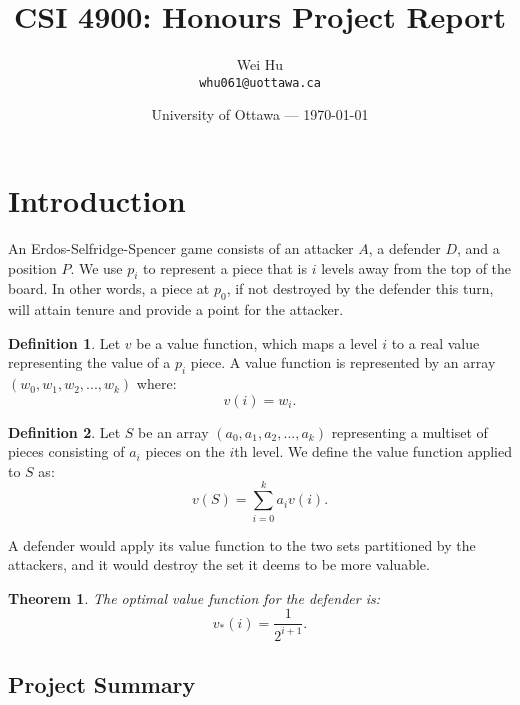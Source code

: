 \documentclass{article}
\title{CSI 4900: Honours Project Report} %
\author{Wei Hu\\ \texttt{whu061@uottawa.ca}} %
\date{University of Ottawa --- \today} %
\theoremstyle{plain}
\newtheorem{thm}{Theorem}[section]
\theoremstyle{definition}
\newtheorem{defn}{Definition}[section]
\theoremstyle{remark}
\begin{document}
\maketitle %


\section{Introduction} %

An Erdos-Selfridge-Spencer game consists of an attacker $A$, a defender $D$, and a position $P$. We use $p_{i}$ to represent a piece that is $i$ levels away from the top of the board. In other words, a piece at $p_{0}$, if not destroyed by the defender this turn, will attain tenure and provide a point for the attacker.

\begin{defn}
Let $v$ be a value function, which maps a level $i$ to a real value representing the value of a $p_{i}$ piece. A value function is represented by an array $(w_{0}, w_{1}, w_{2}, ... , w_{k})$ where:
\begin{equation*}
		v(i) = w_{i}.
\end{equation*}
\end{defn}

\begin{defn}
Let $S$ be an array $(a_{0}, a_{1}, a_{2}, ... , a_{k})$ representing a multiset of pieces consisting of $a_{i}$ pieces on the $i$th level. We define the value function applied to $S$ as:
\begin{equation*}
	v(S) = \sum_{i = 0}^k a_{i}v(i).
\end{equation*}
\end{defn}

A defender would apply its value function to the two sets partitioned by the attackers, and it would destroy the set it deems to be more valuable.

\begin{thm}
The optimal value function for the defender is:
\begin{equation}
	v_{*}(i) = \frac{1}{2^{i+1}}.
\end{equation}
\end{thm}

\subsection{Project Summary}
\end{document}
